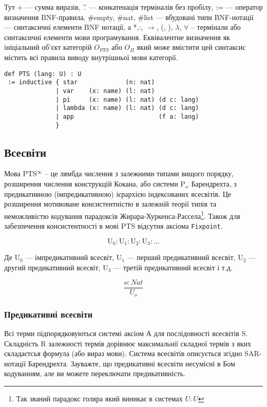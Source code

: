 Тут + --- сумма виразів, '.' --- конкатенація терміналів без пробілу,
:= --- оператор визначення BNF-правила, \#empty, \#nat, \#list --- вбудовані типи BNF-нотації
--- синтаксичні елементи BNF нотації,
а *,:, $\rightarrow$, (, ), $\lambda$, $\forall$ -- термінали або синтаксичні елементи мови програмування.
Еквівалентне визначення як ініціальний об'єкт категорій $O_{PTS}$ або $O_\Pi$
який може вмістити цей синтаксис містить всі правила виводу
внутрішньої мови категорії.

\begin{lstlisting}[mathescape=true]
def PTS (lang: U) : U
 := inductive { star             (n: nat)
              | var    (x: name) (l: nat)
              | pi     (x: name) (l: nat) (d c: lang)
              | lambda (x: name) (l: nat) (d c: lang)
              | app                       (f a: lang)
              }
\end{lstlisting}

\subsection*{Всесвіти}
Мова PTS$^\infty$ -- це лямбда числення з залежними типами вищого порядку,
розширення числення конструкцій Кокана, або системи P$_\omega$ Барендрехта,
з предикативною (імпредикативною) ієрархією індексованих всесвітів.
Це розширення мотивоване консистентністю\cite{Lof75} в залежній теорії типів та
неможливістю кодування парадоксів Жирара-Хуркенса-Рассела\footnote{Так званий парадокс голяра який виникає в системах $U : U$}. Також для
забезпечення консистентності в мові PTS відсутня аксіома \lstinline{Fixpoint}.

$$
    \mathrm{U_0} : \mathrm{U}_1 : \mathrm{U}_2 : \mathrm{U}_3 : ...
$$

Де $\mathrm{U_0}$ --- імпредикативний всесвіт,
   $\mathrm{U_1}$ --- перший предикативний всесвіт,
   $\mathrm{U_2}$ --- другий предикативний всесвіт,
   $\mathrm{U_3}$ --- третій предикативний всесвіт і т.д.

\begin{equation}
\tag{S}
\dfrac
{o : Nat}
{U_o}
\end{equation}

\subsubsection*{Предикативні всесвіти}
Всі терми підпорядковуються системі аксіом А для послідовності всесвітів S.
Складність R залежності термів дорівнює максимальнії складної термів з
яких складаєтсья формула (або вираз мови). Система всесвітів описується
згідно SAR-нотації Барендрехта. Зауважте, що предикативні всесвіти
несумісні в Бом кодуванням, але ви можете переключати предикативність.

